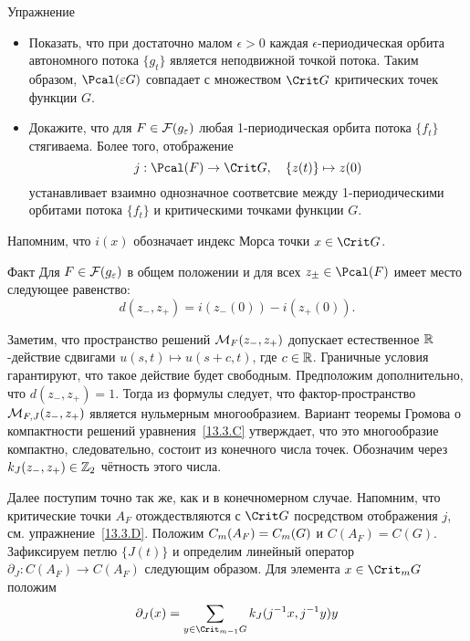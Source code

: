 \begin{ex}{Упражнение}\label{13.3.D}
  \begin{itemize}
  \item
    Показать, что при достаточно малом $\epsilon > 0$ каждая
    $\epsilon$-пе\-ри\-оди\-чес\-кая орбита автономного потока $\{g_{t}\}$
    является неподвижной точкой потока. Таким образом, $\Pcal(\epsilon
    G)$ совпадает с множеством $\Crit G$ критических точек функции $G$.
  \item
    Докажите, что для $F\in\mathcal{F}(g_{\varepsilon})$ любая 1-периодическая
    орбита потока $\{f_{t}\}$ стягиваема. 
    Более того, отображение
    \[
    j : \Pcal(F)\to\Crit G,
    \quad
    \{z(t)\}\mapsto z(0)
    \]
    устанавливает взаимно однозначное соответсвие между
    1-пе\-ри\-оди\-чес\-кими орбитами потока $\{f_{t}\}$ и критическими
    точками функции $G$.
  \end{itemize}
\end{ex}


Напомним, что $i(x)$ обозначает индекс Морса точки $x\in\Crit G$.

\begin{thm}{Факт}\label{13.3.E}
  Для $F\in\mathcal{F}(g_{\varepsilon})$ в общем положении и для всех
  $z_{\pm}\in\Pcal(F)$ имеет место следующее равенство:
  \[
  d(z_{-}, z_{+}) = i(z_{-}(0)) - i(z_{+}(0)).
  \]
\end{thm}

Заметим, что пространство решений $\mathcal{M}_{F}(z_{-},z_{+})$ допускает
естественное $\mathbb{R}$-действие сдвигами $u(s, t)\mapsto u(s+c, t)$, где
$c\in\mathbb{R}$.
Граничные условия гарантируют, что такое действие будет свободным.
Предположим дополнительно, что $d(z_{-}, z_{+}) = 1$.
Тогда из формулы  следует, что
фактор-пространство $\mathcal{M}_{F,J}(z_{-},z_{+})$ является нульмерным
многообразием.
Вариант теоремы Громова о компактности решений
уравнения~\ref{13.3.C} утверждает, что это многообразие компактно,
следовательно, состоит из конечного числа точек.
Обозначим через $k_{J}(z_{-},z_{+})\in\mathbb{Z}_{2}$ чётность этого числа.

Далее поступим точно так же, как и в конечномерном случае.
Напомним, что критические точки $A_{F}$ отождествляются с $\Crit G$
посредством отображения $j$, см. упражнение~\ref{13.3.D}.
Положим $C_{m}(A_{F}) \z= C_{m}(G)$ и $C(A_{F}) = C(G)$.
Зафиксируем петлю $\{J(t)\}$ и определим линейный оператор
$\partial_{J}:C(A_{F})\to C(A_{F})$ следующим образом.
Для элемента $x\in\Crit_{m} G$ положим
\[
\partial_{J}(x)=\sum_{y\in\Crit_{m-1}G}k_{J}(j^{-1}x,j^{-1}y)y
\]


